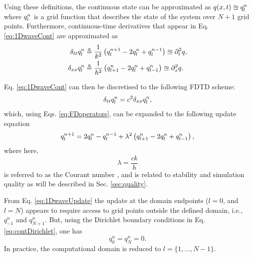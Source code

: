 \documentclass[fleqn]{jaes}
\def\SBcomment[#1]{\textcolor{red}{#1}}
\def\SWcomment[#1]{\textcolor{blue}{#1}}
\begin{document}
Using these definitions, the continuous state can be approximated as $q(x,t) \approxeq q_l^n$ where $q_l^n$ is a grid function that describes the state of the system over $N+1$ grid points. Furthermore, continuous-time derivatives that appear in Eq. \eqref{eq:1DwaveCont} are approximated as
\begin{subequations}{\label{eq:FDoperators}}
\begin{align}
    \dtt \qln &\triangleq \frac{1}{k^2}\left(q_l^{n+1} - 2 \qln + q_l^{n-1}\right)\approxeq\ptt q  ,\\
    \dxx \qln &\triangleq \frac{1}{h^2}\left(q_{l+1}^n - 2 \qln + q_{l-1}^n\right)\approxeq \pxx q .
\end{align}
\end{subequations}

Eq. \eqref{eq:1DwaveCont} can then be discretised to the following FDTD scheme:
\begin{equation}\label{eq:1dWaveDisc}
    \dtt \qln = c^2 \dxx \qln,
\end{equation}
which, using Eqs. \eqref{eq:FDoperators}, can be expanded to the following update equation
\begin{equation}\label{eq:1DwaveUpdate}
    q_l^{n+1} = 2 \qln - q_l^{n-1} + \lambda^2 \left(q_{l+1}^n -2\qln + q_{l-1}^n\right),
\end{equation}
where here, 
\begin{equation}\label{eq:courant}
    \lambda = \frac{c k}{h}
\end{equation} is referred to as the Courant number \cite{Courant1928}, and is related to stability and simulation quality as will be described in Sec. \ref{sec:quality}.

From Eq. \eqref{eq:1DwaveUpdate} the update at the domain endpoints ($l=0$, and $l=N$) appears to require access to grid points outside the defined domain, i.e., $q_{-1}^n$ and $q_{N+1}^n$. But, using the Dirichlet boundary conditions in Eq. \eqref{eq:contDirichlet}, one has 
\begin{equation}\label{eq:discDirichlet}
    q_0^n = q_N^n = 0.
\end{equation}
In practice, the computational domain is reduced to $l=\{1, \hdots, N-1\}$. 
\end{document}
